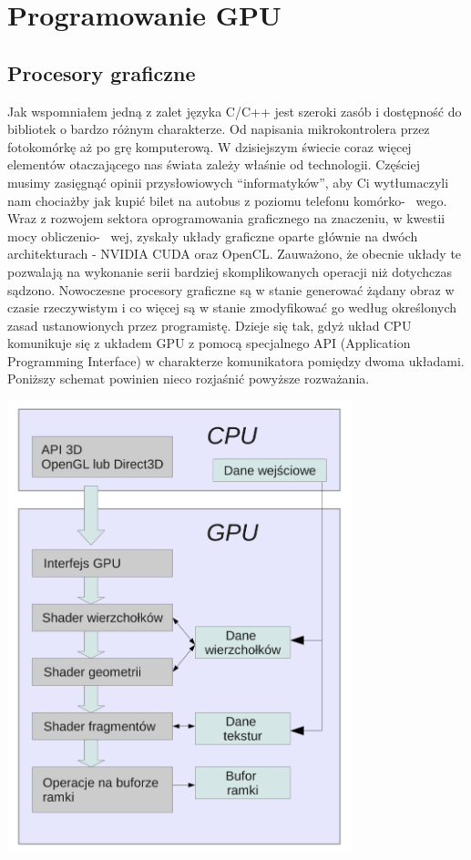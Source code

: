 \documentclass{article}
\begin{document}
\section{Programowanie GPU}
\subsection{Procesory graficzne}
Jak wspomniałem jedną z zalet języka C/C++ jest szeroki zasób i dostępność do bibliotek o bardzo różnym charakterze. Od napisania mikrokontrolera przez fotokomórkę aż po grę komputerową. W dzisiejszym świecie coraz więcej elementów otaczającego nas świata zależy właśnie od technologii. Częściej musimy zasięgnąć opinii przysłowiowych “informatyków”, aby Ci wytłumaczyli nam chociażby jak kupić bilet na autobus z poziomu telefonu komórko- \ wego. Wraz z rozwojem sektora oprogramowania graficznego na znaczeniu, w kwestii mocy obliczenio- \ wej, zyskały układy graficzne oparte głównie na dwóch architekturach - NVIDIA CUDA oraz OpenCL. Zauważono, że obecnie układy te pozwalają na wykonanie serii bardziej skomplikowanych operacji niż dotychczas sądzono. Nowoczesne procesory graficzne są w stanie generować żądany obraz w czasie rzeczywistym i co więcej są w stanie zmodyfikować go według określonych zasad ustanowionych przez programistę. Dzieje się tak, gdyż układ CPU komunikuje się z układem GPU z pomocą specjalnego API (Application Programming Interface) w charakterze komunikatora pomiędzy dwoma układami. Poniższy schemat powinien nieco rozjaśnić powyższe rozważania.
\begin{center}
\includegraphics[width=10cm]{gpu}
\end{center}
\end{document}

